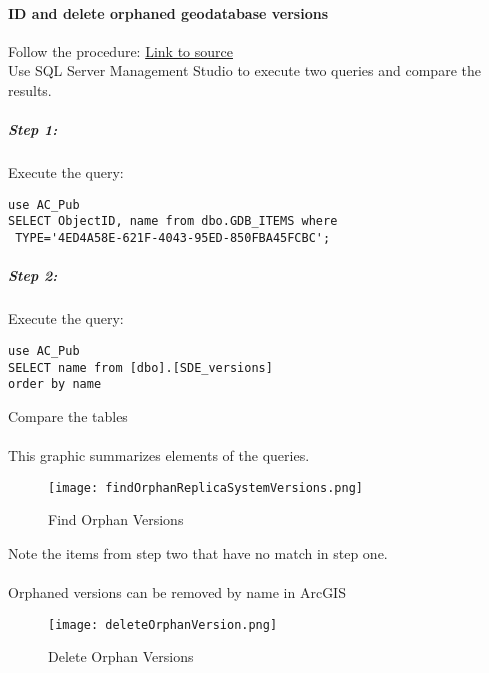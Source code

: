 \documentclass[class=article , crop=false, titlepage, twoside, multi={itemize, figure, verbatim}, float=false]{standalone}
\begin{document}
\paragraph{ID and delete orphaned geodatabase versions \texorpdfstring{\\}{}}
Follow the procedure:
\href{https://support.esri.com/en/technical-article/000010858}{Link to source}\\
Use SQL Server Management Studio to execute two queries and compare the results.
\subparagraph*{Step 1: \texorpdfstring{\\}{}}
Execute the query:
\begin{verbatim}
use AC_Pub
SELECT ObjectID, name from dbo.GDB_ITEMS where
 TYPE='4ED4A58E-621F-4043-95ED-850FBA45FCBC';
\end{verbatim}
\subparagraph*{Step 2: \texorpdfstring{\\}{}}
Execute the query:
\begin{verbatim}
use AC_Pub
SELECT name from [dbo].[SDE_versions]
order by name

\end{verbatim}
Compare the tables
\paragraph*{}This graphic summarizes elements of the queries.
\begin{figure}[h!]
\centering
    \texttt{[image: findOrphanReplicaSystemVersions.png]}
\caption{Find Orphan Versions}
\end{figure}
Note the items from step two that have no match in step one.
\clearpage

\paragraph*{}Orphaned versions can be removed by name in ArcGIS
\begin{figure}[h!]
\centering
    \texttt{[image: deleteOrphanVersion.png]}
\caption{Delete Orphan Versions}
\end{figure}
\clearpage
\end{document}
